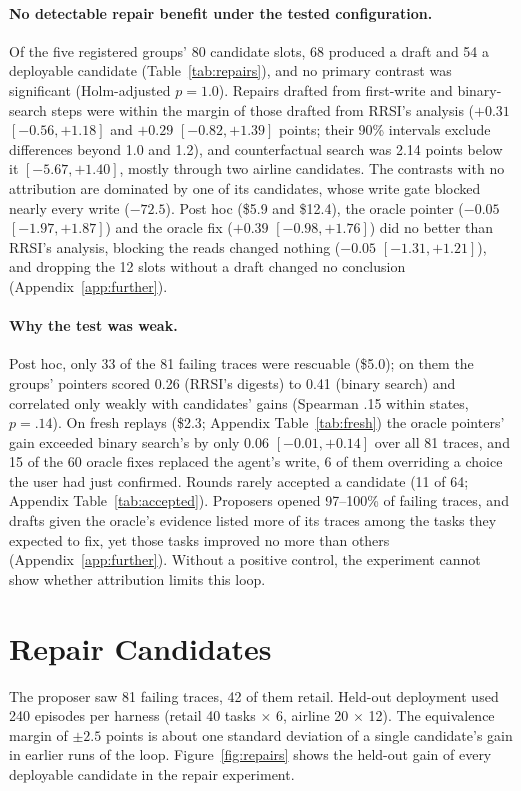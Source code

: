 \documentclass[11pt]{article}
\begin{document}
\paragraph{No detectable repair benefit under the tested configuration.} Of the five registered groups' 80 candidate slots, 68 produced a draft and 54 a deployable candidate (Table~\ref{tab:repairs}), and no primary contrast was significant (Holm-adjusted $p=1.0$). Repairs drafted from first-write and binary-search steps were within the margin of those drafted from RRSI's analysis ($+0.31$ $[-0.56,+1.18]$ and $+0.29$ $[-0.82,+1.39]$ points; their 90\% intervals exclude differences beyond 1.0 and 1.2), and counterfactual search was 2.14 points below it $[-5.67,+1.40]$, mostly through two airline candidates. The contrasts with no attribution are dominated by one of its candidates, whose write gate blocked nearly every write ($-72.5$). Post hoc (\$5.9 and \$12.4), the oracle pointer ($-0.05$ $[-1.97,+1.87]$) and the oracle fix ($+0.39$ $[-0.98,+1.76]$) did no better than RRSI's analysis, blocking the reads changed nothing ($-0.05$ $[-1.31,+1.21]$), and dropping the 12 slots without a draft changed no conclusion (Appendix~\ref{app:further}).

\paragraph{Why the test was weak.} Post hoc, only 33 of the 81 failing traces were rescuable (\$5.0); on them the groups' pointers scored 0.26 (RRSI's digests) to 0.41 (binary search) and correlated only weakly with candidates' gains (Spearman .15 within states, $p=.14$). On fresh replays (\$2.3; Appendix Table~\ref{tab:fresh}) the oracle pointers' gain exceeded binary search's by only 0.06 $[-0.01,+0.14]$ over all 81 traces, and 15 of the 60 oracle fixes replaced the agent's write, 6 of them overriding a choice the user had just confirmed. Rounds rarely accepted a candidate (11 of 64; Appendix Table~\ref{tab:accepted}). Proposers opened 97--100\% of failing traces, and drafts given the oracle's evidence listed more of its traces among the tasks they expected to fix, yet those tasks improved no more than others (Appendix~\ref{app:further}). Without a positive control, the experiment cannot show whether attribution limits this loop.

\section{Repair Candidates}
\label{app:repairs}
The proposer saw 81 failing traces, 42 of them retail. Held-out deployment used 240 episodes per harness (retail 40 tasks $\times$ 6, airline 20 $\times$ 12). The equivalence margin of $\pm2.5$ points is about one standard deviation of a single candidate's gain in earlier runs of the loop. Figure~\ref{fig:repairs} shows the held-out gain of every deployable candidate in the repair experiment.
\end{document}
